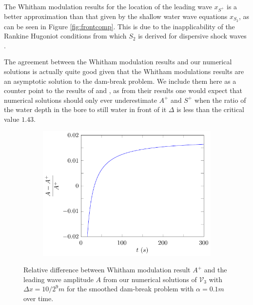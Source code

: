 \documentclass[times]{elsarticle}
\begin{document}
The Whitham modulation results for the location of the leading wave $x_{S^+}$ is a better approximation than that given by the shallow water wave equations $x_{S_2}$, as can be seen in Figure \ref{fig:frontcomp}. This is due to the inapplicability of the Rankine Hugoniot conditions from which $S_2$ is derived for dispersive shock waves \cite{El-Hoefer-2016-11}.

The agreement between the Whitham modulation results and our numerical solutions is actually quite good given that the Whitham modulations results are an asymptotic solution to the dam-break problem. We include them here as a counter point to the results of \citet{El-etal-2006} and \citet{Mitsotakis-etal-2014}, as from their results one would expect that numerical solutions should only ever underestimate $A^+$ and $S^+$ when the ratio of the water depth in the bore to still water in front of it $\Delta$ is less than the critical value $1.43$.
\begin{figure}
	\centering
	\begin{subfigure}{0.5\textwidth}\centering
		\includegraphics[width=\textwidth]{Figure-36.pdf}
	\end{subfigure}%
	\caption{Relative difference between Whitham modulation result $A^+$ and the leading wave amplitude $A$ from our numerical solutions of $\mathcal{V}_3$ with $\Delta x = 10/2^{9}m$ for the smoothed dam-break problem with $\alpha = 0.1m$ over time.}
	\label{fig:amplitudefront}
\end{figure}
\end{document}
